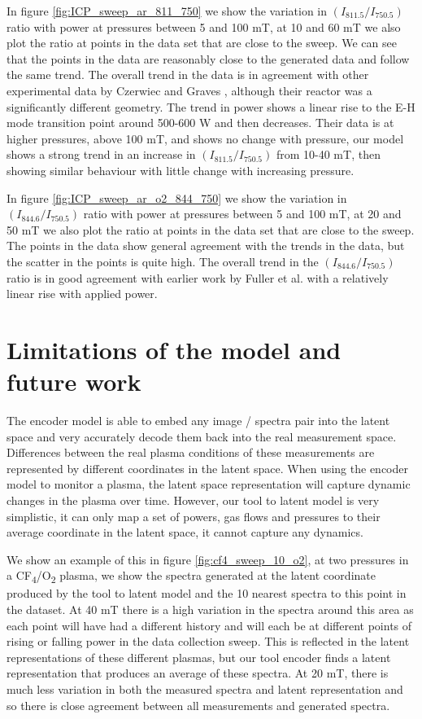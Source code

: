 \documentclass[10pt]{iopart}
\begin{document}
In figure \ref{fig:ICP_sweep_ar_811_750} we show the variation in $(I_{811.5}/I_{750.5})$ ratio with power at pressures between 5 and 100 mT, at 10 and 60 mT we also plot the ratio at points in the data set that are close to the sweep. We can see that the points in the data are reasonably close to the generated data and follow the same trend. The overall trend in the data is in agreement with other experimental data by Czerwiec and Graves \cite{czerwiecModeTransitionsLow2004}, although their reactor was a significantly different geometry. The trend in power shows a linear rise to the E-H mode transition point around 500-600 W and then decreases. Their data is at higher pressures, above 100 mT, and shows no change with pressure, our model shows a strong trend in an increase in $(I_{811.5}/I_{750.5})$ from 10-40 mT, then showing similar behaviour with little change with increasing pressure.

In figure \ref{fig:ICP_sweep_ar_o2_844_750} we show the variation in $(I_{844.6}/I_{750.5})$ ratio with power at pressures between 5 and 100 mT, at 20 and 50 mT we also plot the ratio at points in the data set that are close to the sweep. The points in the data show general agreement with the trends in the data, but the scatter in the points is quite high. The overall trend in the $(I_{844.6}/I_{750.5})$ ratio is in good agreement with earlier work by Fuller et al. \cite{fullerCharacterizationTransformerCoupled2000} with a relatively linear rise with applied power.

\section{Limitations of the model and future work}\label{limit}

The encoder model is able to embed any image / spectra pair into the latent space and very accurately decode them back into the real measurement space. Differences between the real plasma conditions of these measurements are represented by different coordinates in the latent space. When using the encoder model to monitor a plasma, the latent space representation will capture dynamic changes in the plasma over time. However, our tool to latent model is very simplistic, it can only map a set of powers, gas flows and pressures to their average coordinate in the latent space, it cannot capture any dynamics. 

We show an example of this in figure \ref{fig:cf4_sweep_10_o2}, at two pressures in a CF\textsubscript{4}/O\textsubscript{2} plasma, we show the spectra generated at the latent coordinate produced by the tool to latent model and the 10 nearest spectra to this point in the dataset. At 40 mT there is a high variation in the spectra around this area as each point will have had a different history and will each be at different points of rising or falling power in the data collection sweep. This is reflected in the latent representations of these different plasmas, but our tool encoder finds a latent representation that produces an average of these spectra. At 20 mT, there is much less variation in both the measured spectra and latent representation and so there is close agreement between all measurements and generated spectra.
\end{document}
